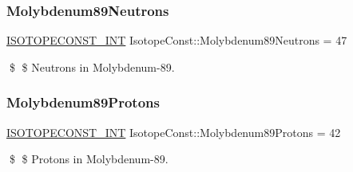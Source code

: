 \subsubsection{\texorpdfstring{Molybdenum89\+Neutrons}{Molybdenum89Neutrons}}
{\footnotesize\ttfamily \mbox{\hyperlink{group___isotope_const-_macros_ga5f18360b3e99483a35c32d789e62621c}{I\+S\+O\+T\+O\+P\+E\+C\+O\+N\+S\+T\+\_\+\+I\+NT}} Isotope\+Const\+::\+Molybdenum89\+Neutrons = 47}

\$ \$ Neutrons in Molybdenum-\/89. \mbox{\label{group___isotope_const-_molybdenum-_mo89_ga7b3197cad45bb55eb36825facf790ca4}} 
\subsubsection{\texorpdfstring{Molybdenum89\+Protons}{Molybdenum89Protons}}
{\footnotesize\ttfamily \mbox{\hyperlink{group___isotope_const-_macros_ga5f18360b3e99483a35c32d789e62621c}{I\+S\+O\+T\+O\+P\+E\+C\+O\+N\+S\+T\+\_\+\+I\+NT}} Isotope\+Const\+::\+Molybdenum89\+Protons = 42}

\$ \$ Protons in Molybdenum-\/89. 